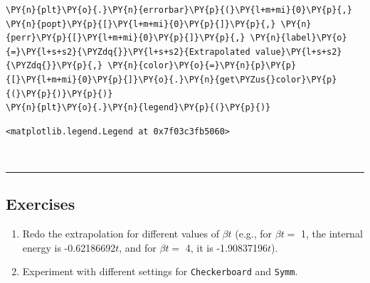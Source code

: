 \begin{tcolorbox}[breakable, size=fbox, boxrule=1pt, pad at break*=1mm,colback=cellbackground, colframe=cellborder]
\begin{Verbatim}[commandchars=\\\{\}]
\PY{n}{plt}\PY{o}{.}\PY{n}{errorbar}\PY{p}{(}\PY{l+m+mi}{0}\PY{p}{,} \PY{n}{popt}\PY{p}{[}\PY{l+m+mi}{0}\PY{p}{]}\PY{p}{,} \PY{n}{perr}\PY{p}{[}\PY{l+m+mi}{0}\PY{p}{]}\PY{p}{,} \PY{n}{label}\PY{o}{=}\PY{l+s+s2}{\PYZdq{}}\PY{l+s+s2}{Extrapolated value}\PY{l+s+s2}{\PYZdq{}}\PY{p}{,} \PY{n}{color}\PY{o}{=}\PY{n}{p}\PY{p}{[}\PY{l+m+mi}{0}\PY{p}{]}\PY{o}{.}\PY{n}{get\PYZus{}color}\PY{p}{(}\PY{p}{)}\PY{p}{)}
\PY{n}{plt}\PY{o}{.}\PY{n}{legend}\PY{p}{(}\PY{p}{)}
\end{Verbatim}
\end{tcolorbox}

            \begin{tcolorbox}[breakable, size=fbox, boxrule=.5pt, pad at break*=1mm, opacityfill=0]
\begin{Verbatim}[commandchars=\\\{\}]
<matplotlib.legend.Legend at 0x7f03c3fb5060>
\end{Verbatim}
\end{tcolorbox}
        
    \begin{center}
    \end{center}
    { \hspace*{\fill} \\}
    
    \begin{center}\rule{0.5\linewidth}{0.5pt}\end{center}

\hypertarget{exercises}{%
\subsection{Exercises}\label{exercises}}

\begin{enumerate}
\def\labelenumi{\arabic{enumi}.}
\tightlist
\item
  Redo the extrapolation for different values of \(\beta t\) (e.g., for
  \(\beta t =\) 1, the internal energy is -0.62186692\(t\), and for
  \(\beta t =\) 4, it is -1.90837196\(t\)).
\item
  Experiment with different settings for \texttt{Checkerboard} and
  \texttt{Symm}.
\end{enumerate}


    
    
    
